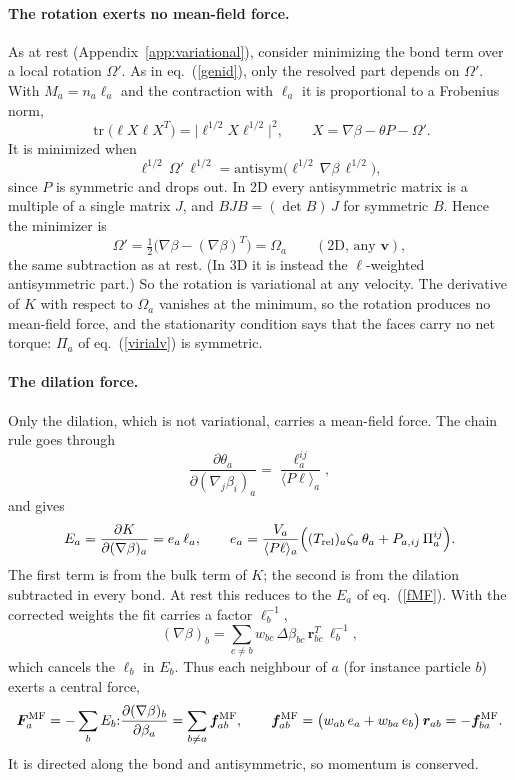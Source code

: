 \documentclass[11pt,aps,preprint,nofootinbib,superscriptaddress,tightenlines]{revtex4-2}
\def\st{\begin{equation}}
\def\stp{\end{equation}}
\def\Eq#1{eq.~(\ref{#1})}
\providecommand{\tr}{\operatorname{tr}}
\newcommand{\avg}[1]{\langle #1\rangle}
\let\oldparagraph\paragraph
\renewcommand{\paragraph}{\par\bigskip\oldparagraph}
\begin{document}
\paragraph{The rotation exerts no mean-field force.}  As at rest
(Appendix~\ref{app:variational}), consider minimizing the bond term over a local
rotation $\Omega'$.  As in \Eq{genid}, only the resolved part depends on
$\Omega'$.  With $M_a=n_a\ell_a$ and the contraction with $\ell_a$ it is
proportional to a Frobenius norm,
\st
\tr\big(\ell X\ell X^T\big)=\big|\ell^{1/2}X\ell^{1/2}\big|^2,\qquad
X=\nabla\beta-\theta P-\Omega' .
\stp
It is minimized when
\st
\ell^{1/2}\,\Omega'\,\ell^{1/2}=\text{antisym}\big(\ell^{1/2}\,\nabla\beta\,\ell^{1/2}\big),
\stp
since $P$ is symmetric and drops out.  In 2D every antisymmetric matrix is a
multiple of a single matrix $J$, and $BJB=(\det B)\,J$ for symmetric $B$.
Hence the minimizer is
\st
\Omega'=\tfrac12\big(\nabla\beta-(\nabla\beta)^T\big)=\Omega_a\qquad(\text{2D, any }\bm v),
\stp
the same subtraction as at rest.  (In 3D it is instead the $\ell$-weighted
antisymmetric part.)
So the rotation is variational at any velocity.  The derivative of $K$ with
respect to $\Omega_a$ vanishes at the minimum, so the rotation produces no
mean-field force, and the stationarity condition says that the
faces carry no net torque: $\Pi_a$ of \Eq{virialv} is symmetric.

\paragraph{The dilation force.}  Only the dilation, which is not variational,
carries a mean-field force.  The chain rule goes through
\st
\frac{\partial\theta_a}{\partial (\nabla_j\beta_i)_a}=\frac{\ell^{ij}_a}{\avg{P\ell}_a},
\stp
and gives
\st
E_a=\frac{\partial K}{\partial (\nabla\beta)_a}=e_a\,\ell_a,\qquad
e_a=\frac{V_a}{\avg{P\ell}_a}\Big((T_{\rm rel})_a\zeta_a\,\theta_a+P_{a,ij}\,\Pi_a^{ij}\Big).
\label{Eav}
\stp
The first term is from the bulk term of $K$; the second is from the
dilation subtracted in every bond.  At rest this reduces to the $E_a$ of
\Eq{fMF}.  With the corrected weights the fit carries a factor $\ell_b^{-1}$,
\st
(\nabla\beta)_b=\sum_{c\neq b}w_{bc}\,\Delta\beta_{bc}\,\bm r_{bc}^T\,\ell_b^{-1},
\stp
which cancels the $\ell_b$ in $E_b$.  Thus each
neighbour of $a$ (for instance particle $b$) exerts a central force,
\st
\bm F^{\rm MF}_a=-\sum_bE_b{:}\frac{\partial (\nabla\beta)_b}{\partial\beta_a}
=\sum_{b\neq a}\bm f^{\rm MF}_{ab},\qquad
\bm f^{\rm MF}_{ab}=\big(w_{ab}\,e_a+w_{ba}\,e_b\big)\,\bm r_{ab}=-\bm f^{\rm MF}_{ba} .
\label{fMFv}
\stp
It is directed along the bond and antisymmetric, so momentum is conserved.
\end{document}
